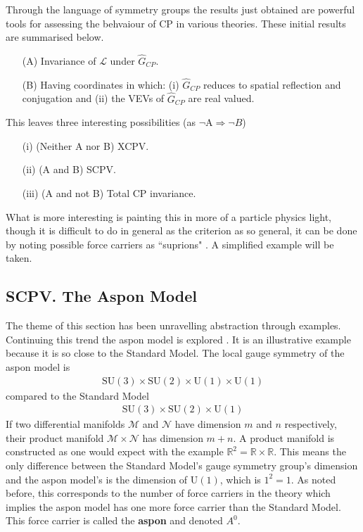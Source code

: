 Through the language of symmetry groups the results just obtained are powerful tools for assessing the behvaiour of CP in various theories. These initial results are summarised below.
\begin{itemize}
\item[(A)] Invariance of $\mathcal{L}$ under $\hat{G}_{CP}$.
\item[(B)] Having coordinates in which: (i) $\hat{G}_{CP}$ reduces to spatial reflection and conjugation and (ii) the VEVs of $\hat{G}_{CP}$ are real valued.
\end{itemize}
This leaves three interesting possibilities  (as $\lnot$A$\Rightarrow\lnot B$) 
\begin{itemize}
\item[(i)] (Neither A nor B) XCPV. 
\item[(ii)] (A and B) SCPV.
\item[(iii)] (A and not B) Total CP invariance.
\end{itemize}
What is more interesting is painting this in more of a particle physics light, though it is difficult to do in general as the criterion as so general, it can be done by noting possible force carriers as ``suprions" \cite{SCPV5}. A simplified example will be taken.\\

\subsection{SCPV. The Aspon Model}

The theme of this section has been unravelling abstraction through examples. Continuing this trend the aspon model is explored \cite{SCPV7}. It is an illustrative example because it is so close to the Standard Model. The local gauge symmetry of the aspon model is
\begin{align*}
\mathrm{SU}(3) \times \mathrm{SU}(2) \times \mathrm{U}(1) \times \mathrm{U}(1)
\end{align*}
compared to the Standard Model
\begin{align*}
\mathrm{SU}(3) \times \mathrm{SU}(2) \times \mathrm{U}(1)
\end{align*}
If two differential manifolds $\mathcal{M}$ and $\mathcal{N}$ have dimension $m$ and $n$ respectively, their product manifold $\mathcal{M} \times \mathcal{N}$ has dimension $m+n$. A product manifold is constructed as one would expect with the example $\mathbb{R}^2 = \mathbb{R}\times \mathbb{R}$. This means the only difference between the Standard Model's gauge symmetry group's dimension and the aspon model's is the dimension of $\mathrm{U}(1)$, which is $1^2=1$. As noted before, this corresponds to the number of force carriers in the theory which implies the aspon model has one more force carrier than the Standard Model. This force carrier is called the \textbf{aspon} and denoted $A^0$.

